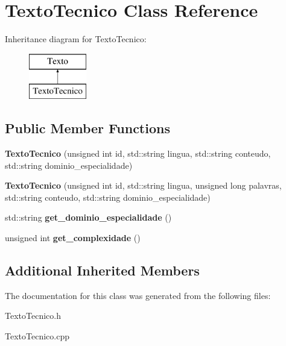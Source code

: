 \hypertarget{class_texto_tecnico}{\section{Texto\-Tecnico Class Reference}
\label{class_texto_tecnico}
}
Inheritance diagram for Texto\-Tecnico\-:\begin{figure}[H]
\begin{center}
\leavevmode
\includegraphics[height=2.000000cm]{class_texto_tecnico}
\end{center}
\end{figure}
\subsection*{Public Member Functions}
\begin{DoxyCompactItemize}
\item 
\hypertarget{class_texto_tecnico_a4c770469d3a65f750b4551bef18629a9}{{\bfseries Texto\-Tecnico} (unsigned int id, std\-::string lingua, std\-::string conteudo, std\-::string dominio\-\_\-especialidade)}\label{class_texto_tecnico_a4c770469d3a65f750b4551bef18629a9}

\item 
\hypertarget{class_texto_tecnico_adc11a5c4366f90c1f22fc986c4bc2131}{{\bfseries Texto\-Tecnico} (unsigned int id, std\-::string lingua, unsigned long palavras, std\-::string conteudo, std\-::string dominio\-\_\-especialidade)}\label{class_texto_tecnico_adc11a5c4366f90c1f22fc986c4bc2131}

\item 
\hypertarget{class_texto_tecnico_af0541bfc3a8fc861eb13abba28a6768d}{std\-::string {\bfseries get\-\_\-dominio\-\_\-especialidade} ()}\label{class_texto_tecnico_af0541bfc3a8fc861eb13abba28a6768d}

\item 
\hypertarget{class_texto_tecnico_a032479cf2086b94534b5d41b94440c2b}{unsigned int {\bfseries get\-\_\-complexidade} ()}\label{class_texto_tecnico_a032479cf2086b94534b5d41b94440c2b}

\end{DoxyCompactItemize}
\subsection*{Additional Inherited Members}


The documentation for this class was generated from the following files\-:\begin{DoxyCompactItemize}
\item 
Texto\-Tecnico.\-h\item 
Texto\-Tecnico.\-cpp\end{DoxyCompactItemize}
